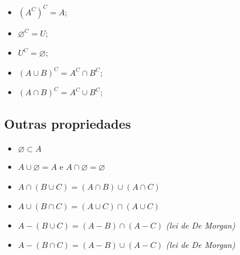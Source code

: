 \begin{itemize}
    \item $(A^C)^C= A$;
    \item $\varnothing^C = U$;
    \item $U^C=\varnothing$;
    \item $(A\cup B)^C= A^C\cap B^C$;
    \item $(A\cap B)^C= A^C\cup B^C$;
\end{itemize}

\subsection{Outras propriedades}
\begin{itemize}
 \item $\varnothing \subset A$
 \item $A \cup \varnothing= A$ e $A \cap \varnothing= \varnothing$
 \item $A \cap (B \cup C) = (A \cap B) \cup (A \cap C)$
 \item $A \cup (B \cap C) = (A \cup C) \cap (A \cup C)$
 \item $A - (B \cup C) = (A - B) \cap (A - C)$ \emph{(lei de De Morgan)}
 \item $A - (B \cap C) = (A - B) \cup (A - C)$ \emph{(lei de De Morgan)}





\end{itemize}


